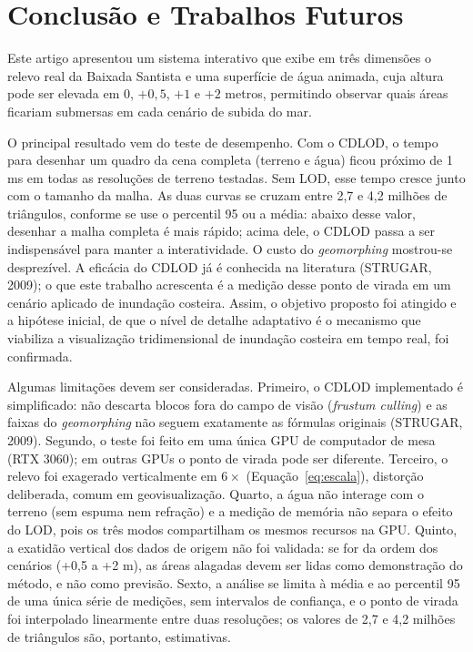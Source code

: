 \documentclass[conference]{IEEEtran}
\begin{document}
\section{Conclusão e Trabalhos Futuros}
\label{sec:conclusao}

Este artigo apresentou um sistema interativo que exibe em três dimensões o
relevo real da Baixada Santista e uma superfície de água animada, cuja
altura pode ser elevada em 0, $+0{,}5$, $+1$ e $+2$ metros, permitindo
observar quais áreas ficariam submersas em cada cenário de subida do mar.

O principal resultado vem do teste de desempenho. Com o CDLOD, o tempo para
desenhar um quadro da cena completa (terreno e água) ficou próximo de 1 ms
em todas as resoluções de terreno testadas. Sem LOD, esse tempo cresce
junto com o tamanho da malha. As duas curvas se cruzam entre 2,7 e 4,2
milhões de triângulos, conforme se use o percentil 95 ou a média: abaixo
desse valor, desenhar a malha completa é mais rápido; acima dele, o CDLOD
passa a ser indispensável para manter a interatividade. O custo do \emph{geomorphing} mostrou-se
desprezível. A eficácia do CDLOD já é conhecida na literatura (STRUGAR,
2009); o que este trabalho acrescenta é a medição desse ponto de virada em
um cenário aplicado de inundação costeira. Assim, o objetivo proposto foi
atingido e a hipótese inicial, de que o nível de detalhe adaptativo é o
mecanismo que viabiliza a visualização tridimensional de inundação costeira
em tempo real, foi confirmada.

Algumas limitações devem ser consideradas. Primeiro, o CDLOD implementado é
simplificado: não descarta blocos fora do campo de visão (\emph{frustum
culling}) e as faixas do \emph{geomorphing} não seguem exatamente as
fórmulas originais (STRUGAR, 2009). Segundo, o teste foi feito em uma única
GPU de computador de mesa (RTX 3060); em outras GPUs o ponto de virada pode ser diferente.
Terceiro, o relevo foi exagerado verticalmente em $6\times$
(Equação~\eqref{eq:escala}), distorção deliberada, comum em geovisualização.
Quarto, a água não interage com o terreno (sem espuma nem refração) e a
medição de memória não separa o efeito do LOD, pois os três modos
compartilham os mesmos recursos na GPU. Quinto, a exatidão vertical dos
dados de origem não foi validada: se for da ordem dos cenários (+0,5 a
+2 m), as áreas alagadas devem ser lidas como demonstração do método, e não
como previsão. Sexto, a análise se limita à média e ao percentil 95 de uma
única série de medições, sem intervalos de confiança, e o ponto de virada foi
interpolado linearmente entre duas resoluções; os valores de 2,7 e 4,2
milhões de triângulos são, portanto, estimativas.
\end{document}

